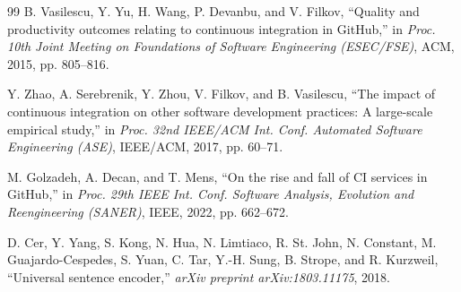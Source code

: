 \begin{thebibliography}{99}
B. Vasilescu, Y. Yu, H. Wang, P. Devanbu, and V. Filkov, ``Quality and productivity outcomes relating to continuous integration in GitHub,'' in \textit{Proc. 10th Joint Meeting on Foundations of Software Engineering (ESEC/FSE)}, ACM, 2015, pp. 805--816.

Y. Zhao, A. Serebrenik, Y. Zhou, V. Filkov, and B. Vasilescu, ``The impact of continuous integration on other software development practices: A large-scale empirical study,'' in \textit{Proc. 32nd IEEE/ACM Int. Conf. Automated Software Engineering (ASE)}, IEEE/ACM, 2017, pp. 60--71.

M. Golzadeh, A. Decan, and T. Mens, ``On the rise and fall of CI services in GitHub,'' in \textit{Proc. 29th IEEE Int. Conf. Software Analysis, Evolution and Reengineering (SANER)}, IEEE, 2022, pp. 662--672.

D. Cer, Y. Yang, S. Kong, N. Hua, N. Limtiaco, R. St. John, N. Constant, M. Guajardo-Cespedes, S. Yuan, C. Tar, Y.-H. Sung, B. Strope, and R. Kurzweil, ``Universal sentence encoder,'' \textit{arXiv preprint arXiv:1803.11175}, 2018.

\end{thebibliography}
